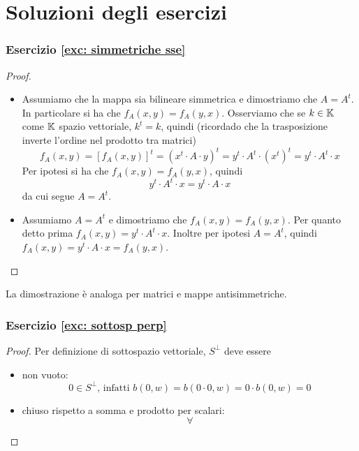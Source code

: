 \documentclass{article}     %
\begin{document}
\newpage
\section{Soluzioni degli esercizi}
\subsubsection*{Esercizio \ref{exc: simmetriche sse}}\label{sol: simmetriche sse}
\begin{proof}~
    \begin{itemize}
        \item [\say{$\Rarr$}] Assumiamo che la mappa sia bilineare simmetrica e dimostriamo che $A=A^t$. In particolare si ha che $f_A(x,y)=f_A(y,x)$. Osserviamo che se $k \in \mathbb{K}$ come $\mathbb{K}$ spazio vettoriale, $k^t=k$, quindi (ricordado che la trasposizione inverte l'ordine nel prodotto tra matrici)
        \[f_A(x,y)=[f_A(x,y)]^t=\left( x^t\cdot A \cdot y \right)^t= y^t\cdot  A^t \cdot \left( x^t \right)^t= y^t\cdot A^t \cdot x \] 
        Per ipotesi si ha che $f_A(x,y)=f_A(y,x)$, quindi 
        \[y^t\cdot A^t \cdot x= y^t\cdot A \cdot x\]
        da cui segue $A=A^t$.
        \item [\say{$\Larr$}] Assumiamo $A=A^t$ e dimostriamo che $f_A(x,y)=f_A(y,x)$. Per quanto detto prima $f_A(x,y)=y^t\cdot A^t\cdot x$. Inoltre per ipotesi $A=A^t$, quindi $f_A(x,y)=y^t\cdot A\cdot x=f_A(y,x)$.
    \end{itemize}
\end{proof}
La dimostrazione è analoga per matrici e mappe antisimmetriche.

\subsubsection*{Esercizio \ref{exc: sottosp perp}}\label{sol: sottosp perp}
\begin{proof}Per definizione di sottospazio vettoriale, $S^\perp$ deve essere
    \begin{itemize}
        \item non vuoto:
        \[0\in S^\perp\text{, infatti }b(0,w)=b(0\cdot 0,w)=0\cdot b(0,w)=0\]
        \item chiuso rispetto a somma e prodotto per scalari:
        \[\forall \]
    \end{itemize}
\end{proof}
\end{document}

